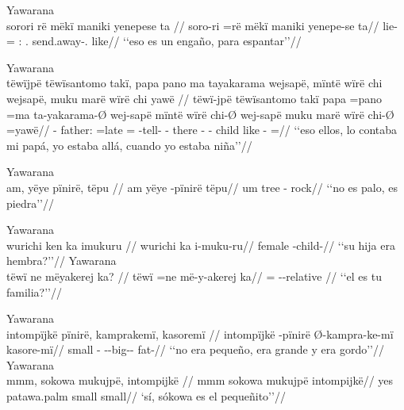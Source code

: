 \documentclass{memoir}
\begin{document}
\ex Yawarana \\
\label{cat-main-aff-npred-nsubj-maniki}    \begingl
    \glpreamble sorori rë mëkï maniki yenepese ta //
    \gla soro-ri =rë mëkï maniki yenepe-se ta//
    \glb lie- = : . send.away-. like//
        \glft ‘‘eso es un engaño, para espantar’’//  
    \endgl 
\xe

\ex Yawarana \\
\label{cat-sub-aff-npred-nsubj-cop}    \begingl
    \glpreamble tëwïjpë tëwïsantomo takï, papa pano ma tayakarama wejsapë, mïntë wïrë chi wejsapë, muku marë wïrë chi yawë //
    \gla tëwï-jpë tëwïsantomo takï papa =pano =ma ta-yakarama-Ø wej-sapë mïntë wïrë chi-Ø wej-sapë muku marë wïrë chi-Ø =yawë//
    \glb {}-   father: =late = -tell- - there  - - child like  - =//
        \glft ‘‘eso ellos, lo contaba mi papá, yo estaba allá, cuando yo estaba niña’’//  
    \endgl 
\xe

\ex Yawarana \\
\label{cat-main-neg-npred-pinire-nsubj}    \begingl
    \glpreamble am, yëye pïnirë, tëpu //
    \gla am yëye -pïnirë tëpu//
    \glb um tree - rock//
        \glft ‘‘no es palo, es piedra’’//  
    \endgl 
\xe

\pex\label{cat-main-q-npred-nsubj}    \a Yawarana\\
    \label{convfemgrme-315}        \begingl
        \glpreamble wurichi ken ka imukuru //
        \gla wurichi ka i-muku-ru//
        \glb female  -child-//
            \glft ‘‘su hija era hembra?’’//  
        \endgl 
    \a Yawarana\\
    \label{histpajirdi-278}        \begingl
        \glpreamble tëwï ne mëyakerej ka? //
        \gla tëwï =ne më-y-akerej ka//
        \glb {} = --relative //
            \glft ‘‘el es tu familia?’’//  
        \endgl 
\xe

\pex\label{perm-main-aff-npred-nsubj}    \a Yawarana\\
    \label{conv1stenc-80}        \begingl
        \glpreamble intompïjkë pïnirë, kamprakemï, kasoremï //
        \gla intompïjkë -pïnirë Ø-kampra-ke-mï kasore-mï//
        \glb small - --big-- fat-//
            \glft ‘‘no era pequeño, era grande y era gordo’’//  
        \endgl 
    \a Yawarana\\
    \label{convinsectmaj-118}        \begingl
        \glpreamble mmm, sokowa mukujpë, intompijkë //
        \gla mmm sokowa mukujpë intompijkë//
        \glb yes patawa.palm small small//
            \glft ‘sí, sókowa es el pequeñito’’//  
        \endgl 
\xe
\end{document}
